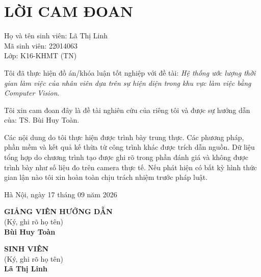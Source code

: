 \section*{LỜI CAM ĐOAN}
Họ và tên sinh viên: Lã Thị Linh\\
Mã sinh viên: 22014063\\
Lớp: K16-KHMT (TN)

Tôi đã thực hiện đồ án/khóa luận tốt nghiệp với đề tài: \textit{Hệ thống ước lượng thời gian làm việc của nhân viên dựa trên sự hiện diện trong khu vực làm việc bằng Computer Vision}.

Tôi xin cam đoan đây là đề tài nghiên cứu của riêng tôi và được sự hướng dẫn của: TS. Bùi Huy Toàn.

Các nội dung do tôi thực hiện được trình bày trung thực. Các phương pháp, phần mềm và kết quả kế thừa từ công trình khác được trích dẫn nguồn. Dữ liệu tổng hợp do chương trình tạo được ghi rõ trong phần đánh giá và không được trình bày như số liệu đo trên camera thực tế. Nếu phát hiện có bất kỳ hình thức gian lận nào tôi xin hoàn toàn chịu trách nhiệm trước pháp luật.

\vspace{0.8cm}
\begin{flushright}
Hà Nội, ngày 17 tháng 09 năm 2026
\end{flushright}
\noindent\begin{minipage}[t]{0.48\textwidth}\centering
\textbf{GIẢNG VIÊN HƯỚNG DẪN}\\
(Ký, ghi rõ họ tên)\\[2cm]
\textbf{Bùi Huy Toàn}
\end{minipage}\hfill
\begin{minipage}[t]{0.48\textwidth}\centering
\textbf{SINH VIÊN}\\
(Ký, ghi rõ họ tên)\\[2cm]
\textbf{Lã Thị Linh}
\end{minipage}
\clearpage
